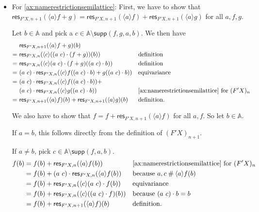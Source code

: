 \documentclass[11pt,a4paper]{amsart}
\newcommand{\res}{\mathsf{res}}
\newcommand{\Names}{\mathbb{A}}
\newcommand{\fresh}{\mathbin{\#}}
\newcommand{\supp}{\mathsf{supp}}
\newcommand{\bind}[1]{\langle #1\rangle}
\theoremstyle{plain}
\numberwithin{equation}{section}
\newcommand{\+}[1]{\mathcal{#1}\xspace}
\theoremstyle{definition}
\begin{document}
\begin{itemize}
  \item For \eqref{ax:namerestrictionsemilattice}:
    First, we have to show that \(\res_{F'X, n+1}(\bind{a} f + g) = \res_{F'X, n+1}(\bind{a} f) + \res_{F'X, n+1}(\bind{a} g)\) for all \(a,f,g\).

    Let \(b \in \Names\) and pick a \(c \in \Names \setminus \supp(f,g,a,b)\).
    We then have
    \begin{align*}
      &\res_{F'X,n+1}(\bind{a} f + g)(b) \\
      =~&\res_{F'X,n}(\bind{c} ((a\ c) \cdot (f + g))(b)) && \text{definition} \\
      =~&\res_{F'X,n}(\bind{c} (a\ c) \cdot (f + g)((a\ c) \cdot b)) && \text{definition} \\
      =~&(a\ c) \cdot \res_{F'X,n}(\bind{c} f((a\ c) \cdot b) + g((a\ c) \cdot b)) && \text{equivariance} \\
      =~&(a\ c) \cdot \res_{F'X,n}(\bind{c} f((a\ c) \cdot b)) + \\&(a\ c) \cdot \res_{F'X,n}(\bind{c} g((a\ c) \cdot b)) && \text{\eqref{ax:namerestrictionsemilattice} for } (F'X)_n \\
      =~&\res_{F'X,n+1}(\bind{a} f)(b) + \res_{F'X,n+1}(\bind{a} g)(b) && \text{definition}.
    \end{align*}

    We also have to show that \(f = f + \res_{F'X, n+1}(\bind{a} f)\) for all \(a,f\).
    So let \(b \in \Names\).

    If \(a = b\), this follows directly from the definition of \((F'X)_{n + 1}\).

    If \(a \neq b\), pick \(c \in \Names \setminus \supp(f,a,b)\).
    \begin{align*}
      f(b)
      &= f(b) + \res_{F'X,n}(\bind{a} f(b)) && \text{\eqref{ax:namerestrictionsemilattice} for } (F'X)_n \\
      &= f(b) + (a\ c) \cdot \res_{F'X, n}(\bind{a} f(b)) && \text{because } a,c\fresh\bind{a}f(b) \\
      &= f(b) + \res_{F'X, n}(\bind{c} (a\ c) \cdot f(b)) && \text{equivariance} \\
      &= f(b) + \res_{F'X, n}(\bind{c} ((a\ c) \cdot f)(b)) && \text{because } (a\ c) \cdot b = b \\
      &= f(b) + \res_{F'X,n+1}(\bind{a}f)(b) && \text{definition}.
    \end{align*}
\end{itemize}
\end{document}
